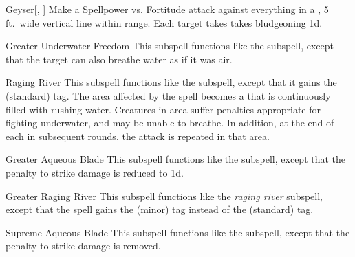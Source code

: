 \begin{ability}[\nth{3}]{Geyser}[, ]
Make a Spellpower vs. Fortitude attack against everything in a \arealarge, 5 ft.\ wide vertical line within \rngmed range.
\hit Each target takes takes bludgeoning  \plus1d.
\end{ability}
\vspace{0.25em}


\begin{ability}[\nth{3}]{Greater Underwater Freedom}
This subspell functions like the  subspell, except that the target can also breathe water as if it was air.
\end{ability}
\vspace{0.25em}


\begin{ability}[\nth{4}]{Raging River}
This subspell functions like the  subspell, except that it gains the  (standard) tag.
The area affected by the spell becomes a  that is continuously filled with rushing water.
Creatures in area suffer penalties appropriate for fighting underwater, and may be unable to breathe.
In addition, at the end of each  in subsequent rounds, the attack is repeated in that area.
\end{ability}
\vspace{0.25em}


\begin{ability}[\nth{6}]{Greater Aqueous Blade}
This subspell functions like the  subspell, except that the penalty to strike damage is reduced to \minus1d.
\end{ability}
\vspace{0.25em}


\begin{ability}[\nth{7}]{Greater Raging River}
This subspell functions like the \textit{raging river} subspell, except that the spell gains the  (minor) tag instead of the  (standard) tag.
\end{ability}
\vspace{0.25em}


\begin{ability}[\nth{9}]{Supreme Aqueous Blade}
This subspell functions like the  subspell, except that the penalty to strike damage is removed.
\end{ability}
\vspace{0.25em}

